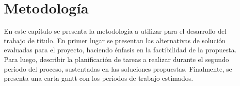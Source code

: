 
\chapter{Metodología}\label{chapter:metodologia}

En este capítulo se presenta la metodología a utilizar para el desarrollo del trabajo de título. En primer lugar se presentan las alternativas de solución evaluadas para el proyecto, haciendo énfasis en la factibilidad de la propuesta. Para luego, describir la planificación de tareas a realizar durante el segundo periodo del proceso, sustentadas en las soluciones propuestas. Finalmente, se presenta una carta gantt con los periodos de trabajo estimados.


%
%
%

%
%
%
%
%


